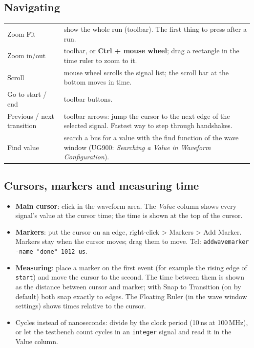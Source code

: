 \documentclass[11pt,a4paper]{article}
\newcommand{\code}[1]{\texttt{#1}}
\renewcommand{\_}{\oldunderscore\allowbreak{}}
\newcommand{\menu}[1]{\textsf{#1}}
\begin{document}
\subsection{Navigating}
\begin{tabularx}{\textwidth}{@{}lY@{}}
\toprule
Zoom Fit & show the whole run (toolbar). The first thing to press after a run. \\
Zoom in/out & toolbar, or \textbf{Ctrl + mouse wheel}; drag a rectangle in the time ruler to zoom to it. \\
Scroll & mouse wheel scrolls the signal list; the scroll bar at the bottom moves in time. \\
Go to start / end & toolbar buttons. \\
Previous / next transition & toolbar arrows: jump the cursor to the next edge of the selected signal. Fastest way to step through handshakes. \\
Find value & search a bus for a value with the find function of the wave window (UG900: \emph{Searching a Value in Waveform Configuration}). \\
\bottomrule
\end{tabularx}

\subsection{Cursors, markers and measuring time}
\begin{itemize}[nosep]
  \item \textbf{Main cursor}: click in the waveform area. The \emph{Value} column shows every signal's value at the cursor time; the time is shown at the top of the cursor.
  \item \textbf{Markers}: put the cursor on an edge, right-click \menu{> Markers > Add Marker}. Markers stay when the cursor moves; drag them to move. Tcl: \code{add\_wave\_marker -name "done" 1012 us}.
  \item \textbf{Measuring}: place a marker on the first event (for example the rising edge of \code{start}) and move the cursor to the second. The time between them is shown as the distance between cursor and marker; with \menu{Snap to Transition} (on by default) both snap exactly to edges. The \menu{Floating Ruler} (in the wave window settings) shows times relative to the cursor.
  \item Cycles instead of nanoseconds: divide by the clock period (10\,ns at 100\,MHz), or let the testbench count cycles in an \code{integer} signal and read it in the Value column.
\end{itemize}
\end{document}
